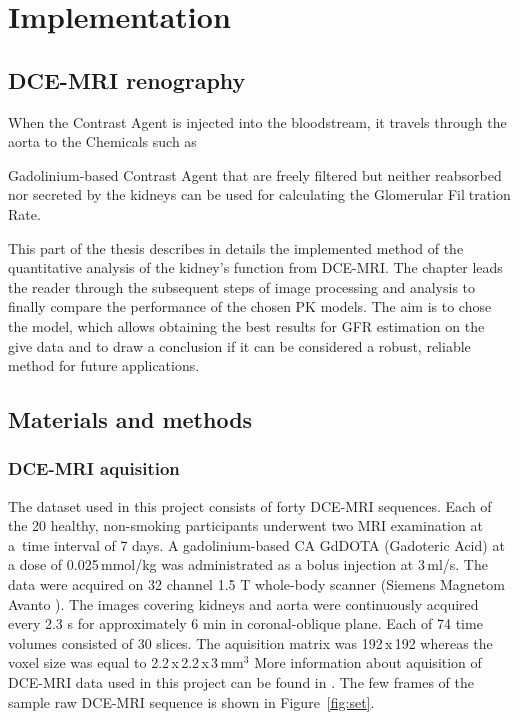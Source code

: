 \chapter{Implementation}
\section{DCE-MRI renography}
When the Contrast Agent is injected into the bloodstream, it travels through the aorta to the 
Chemicals such as


Gadolinium-based Contrast Agent that are freely filtered but neither reabsorbed nor secreted by the kidneys
can be used for calculating the Glomerular Filtration Rate.

This part of the thesis describes in details the implemented method of the quantitative analysis of the kidney's function from DCE-MRI. The chapter leads the reader through the subsequent steps of image processing and analysis to finally compare the performance of the chosen PK models. The aim is to chose the model, which allows obtaining the best results for GFR estimation on the give data and to draw a conclusion if it can be considered a robust, reliable method for future applications. 


\section{Materials and methods}
\subsection{DCE-MRI aquisition}
The dataset used in this project consists of forty DCE-MRI sequences. Each of the 20 healthy, non-smoking participants underwent two MRI examination at a~time interval of 7 days.
A gadolinium-based CA GdDOTA (Gadoteric Acid) at a dose of 0.025\,mmol/kg was administrated as a bolus injection at 3\,ml/s.
The data were acquired on 32 channel 1.5 T whole-body scanner (Siemens Magnetom Avanto \cite{simens}).
The  images covering kidneys and aorta were continuously acquired every 2.3 s for approximately 6 min in coronal-oblique plane.
Each of 74 time volumes consisted of 30 slices.
The aquisition matrix was 192\,x\,192 whereas the voxel size was equal to 2.2\,x\,2.2\,x\,3\,mm$^3$
More information about aquisition of DCE-MRI data used in this project can be found in \cite{eikefjord2017dynamic}.
The few frames of the sample raw DCE-MRI sequence is shown in Figure~\ref{fig:set}.



